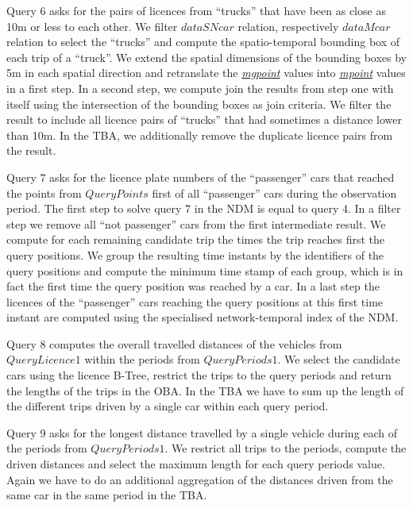 \documentclass[a4paper]{article}
\newcommand{\dt}[1]{\textsl{\underline{#1}}}
\begin{document}
Query 6 asks for the pairs of licences from ``trucks'' that have been as close as
10m or less to each other. We filter $dataSNcar$ relation, respectively $dataMcar$
relation to select the ``trucks'' and compute the spatio-temporal bounding box
of each trip of a ``truck''. We extend the spatial dimensions of the bounding boxes
by 5m in each spatial direction and retranslate the \dt{mgpoint} values into \dt{mpoint}
values in a first step. In a second step, we compute join the results from
step one with itself using the intersection of the bounding boxes as join criteria.
We filter the result to include all licence pairs of ``trucks'' that had sometimes
a distance lower than 10m. In the TBA, we additionally remove the duplicate licence
pairs from the result.

Query 7 asks for the licence plate numbers of the ``passenger'' cars that reached
the points from $QueryPoints$ first of all ``passenger'' cars during the
observation period. The first step to solve query 7 in the NDM is
equal to query 4. In a filter step we remove all ``not passenger'' cars from the
first intermediate result. We compute for each remaining candidate trip the times
the trip reaches first the query positions. We group the resulting time instants
by the identifiers of the query positions and compute the minimum time stamp of
each group, which is in fact the first time the query position was reached by a
car. In a last step the licences of the ``passenger'' cars reaching the query
positions at this first time instant are computed using the specialised
network-temporal index of the NDM.

Query 8 computes the overall travelled distances of the vehicles from $QueryLicence1$
within the periods from $QueryPeriods1$. We select the candidate cars using the
licence B-Tree, restrict the trips to the query periods and return the lengths of the
trips in the OBA. In the TBA we have to sum up the length of the different
trips driven by a single car within each query period.

Query 9 asks for the longest distance travelled by a single vehicle during each
of the periods from $QueryPeriods1$. We restrict all trips to the periods, compute
the driven distances and select the maximum length for each query periods value.
Again we have to do an additional aggregation of the distances driven from the same
car in the same period in the TBA.
\end{document}
